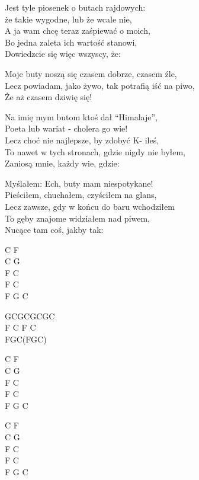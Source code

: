 \begin{text}
    Jest tyle piosenek o butach rajdowych:\\
    że takie wygodne, lub że wcale nie,\\
    A ja wam chcę teraz zaśpiewać o moich,\\
    Bo jedna zaleta ich wartość stanowi,\\
    Dowiedzcie się więc wszyscy, że:

    \vin Moje buty noszą się czasem dobrze, czasem źle,\\
    \vin Lecz powiadam, jako żywo, tak potrafią iść na piwo,\\
    \vin Że aż czasem dziwię się!

    Na imię mym butom ktoś dał “Himalaje”,\\
    Poeta lub wariat - cholera go wie!\\
    Lecz choć nie najlepsze, by zdobyć K- ileś,\\
    To nawet w tych stronach, gdzie nigdy nie byłem,\\
    Zaniosą mnie, każdy wie, gdzie:

    Myślałem: Ech, buty mam niespotykane!\\
    Pieściłem, chuchałem, czyściłem na glans,\\
    Lecz zawsze, gdy w końcu do baru wchodziłem\\
    To gęby znajome widziałem nad piwem,\\
    Nucące tam coś, jakby tak:
\end{text}
\begin{chord}
    C F\\
    C G\\
    F C\\
    F C\\
    F G C

    GCGCGCGC\\
    F C F C\\
    FGC(FGC)

    C F\\
    C G\\
    F C\\
    F C\\
    F G C

    C F\\
    C G\\
    F C\\
    F C\\
    F G C
\end{chord}